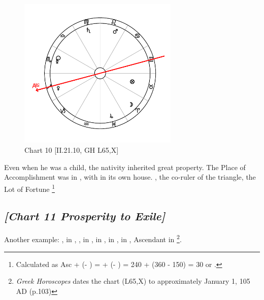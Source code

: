 \clearpage
\begin{figure}
\centering
\vspace{-20pt}
\includegraphics[width=0.68\textwidth]{charts/2_21_10}
\caption{Chart 10 [II.21.10, GH L65,X]}
\label{fig:chart10}
\end{figure}

Even when he was a child, the nativity inherited great property. The Place of Accomplishment was in \Pisces, with \Jupiter\xspace in its own house. \Venus, the co-ruler of the
triangle, the Lot of Fortune
\footnote{Calculated as Asc + (\Moon\xspace\xspace - \Sun) = \Sagittarius\xspace + (\Aries\xspace - \Virgo) = 240 + (360 - 150) = 30 or \Taurus.}
\clearpage

\newpage
\subsection*{\textit{[Chart 11 Prosperity to Exile]}}

Another example: \Sun, \Mercury\xspace in \Capricorn, \Moon, \Saturn\xspace in \Sagittarius, \Jupiter\xspace in \Cancer, \Mars\xspace in \Virgo, \Venus\xspace in \Aquarius, Ascendant in \Libra
\footnote{\textit{Greek Horoscopes} dates the chart (L65,X) to approximately January 1, 105 AD (p.103)}.

